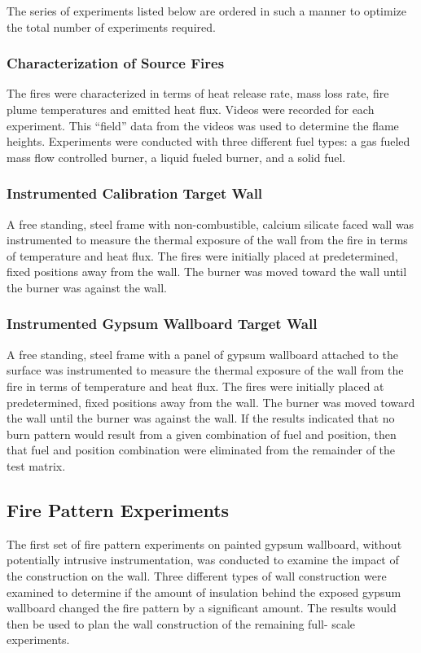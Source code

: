 \documentclass[twoside]{uocthesis}
\begin{document}
The series of experiments listed below are ordered in such a manner to optimize the total number of experiments required.

\subsubsection{Characterization of Source Fires}

The fires were characterized in terms of heat release rate, mass loss rate, fire plume temperatures and emitted heat flux. Videos were recorded for each experiment.  This ``field'' data from the videos was  used to determine the flame heights. Experiments were conducted with three different fuel types: a gas fueled mass flow controlled burner, a liquid fueled burner, and a solid fuel.

\subsubsection{Instrumented Calibration Target Wall}

A free standing, steel frame with non-combustible, calcium silicate faced wall was instrumented to measure the thermal exposure of the wall from the fire in terms of temperature and heat flux.  The fires were initially placed at predetermined, fixed positions away from the wall. The burner was moved toward the wall until the burner was against the wall.

\subsubsection{Instrumented Gypsum Wallboard Target Wall}

A free standing, steel frame with a panel of gypsum wallboard attached to the surface was instrumented to measure the thermal exposure of the wall from the fire in terms of temperature and heat flux.  The fires were initially placed at predetermined, fixed positions away from the wall. The burner was moved toward the wall until the burner was against the wall.  If the results indicated that no burn pattern would result from a given combination of fuel and position, then that fuel and position combination were eliminated from the remainder of the test matrix.

\subsection{Fire Pattern Experiments}

The first set of fire pattern experiments on painted gypsum wallboard, without potentially intrusive instrumentation, was conducted to examine the impact of the construction on the wall. Three different types of wall construction were examined to determine if the amount of insulation behind the exposed gypsum wallboard changed the fire pattern by a significant amount.  The results would then be used to plan the wall construction of the remaining full- scale experiments. 
\end{document}
